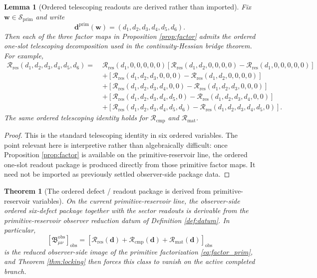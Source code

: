 \documentclass[11pt]{article}
\newcommand{\ObsBurden}{\mathfrak B_{\mu\nu}^{\mathrm{obs}}}
\newcommand{\ObserverClass}[1]{\left[#1\right]_{\mathrm{obs}}}
\newcommand{\DefectTuple}{\mathbf d}
\newcommand{\PrimDefectTuple}{\mathbf d^{\mathrm{prim}}}
\newcommand{\ResidualRead}{\mathscr R_{\mathrm{res}}}
\newcommand{\CompletionRead}{\mathscr R_{\mathrm{cmp}}}
\newcommand{\MatterRead}{\mathscr R_{\mathrm{mat}}}
\newcommand{\PrimShell}{\mathcal S_{\mathrm{prim}}}
\newtheorem{lemma}{Lemma}
\newtheorem{theorem}{Theorem}
\begin{document}
\begin{lemma}[Ordered telescoping readouts are derived rather than imported]
\label{lem:tel}
Fix \(\mathbf w\in\PrimShell\) and write
\[
\PrimDefectTuple(\mathbf w)=(d_1,d_2,d_3,d_4,d_5,d_6).
\]
Then each of the three factor maps in Proposition \ref{prop:factor} admits the ordered one-slot telescoping decomposition used in the continuity-Hessian bridge theorem. For example,
\begin{equation}
\begin{aligned}
\ResidualRead(d_1,d_2,d_3,d_4,d_5,d_6)
=\;&
\ResidualRead(d_1,0,0,0,0,0)
[\ResidualRead(d_1,d_2,0,0,0,0)-\ResidualRead(d_1,0,0,0,0,0)]
\\
&+[\ResidualRead(d_1,d_2,d_3,0,0,0)-\ResidualRead(d_1,d_2,0,0,0,0)]
\\
&+[\ResidualRead(d_1,d_2,d_3,d_4,0,0)-\ResidualRead(d_1,d_2,d_3,0,0,0)]
\\
&+[\ResidualRead(d_1,d_2,d_3,d_4,d_5,0)-\ResidualRead(d_1,d_2,d_3,d_4,0,0)]
\\
&+[\ResidualRead(d_1,d_2,d_3,d_4,d_5,d_6)-\ResidualRead(d_1,d_2,d_3,d_4,d_5,0)].
\end{aligned}
\label{eq:tel}
\end{equation}
The same ordered telescoping identity holds for \(\CompletionRead\) and \(\MatterRead\).
\end{lemma}

\begin{proof}
This is the standard telescoping identity in six ordered variables. The point relevant here is interpretive rather than algebraically difficult: once Proposition \ref{prop:factor} is available on the primitive-reservoir line, the ordered one-slot readout package is produced directly from those primitive factor maps. It need not be imported as previously settled observer-side package data.
\end{proof}

\begin{theorem}[The ordered defect / readout package is derived from primitive-reservoir variables]
\label{thm:readouts}
On the current primitive-reservoir line, the observer-side ordered six-defect package together with the sector readouts is derivable from the primitive-reservoir observer reduction datum of Definition \ref{def:datum}. In particular,
\begin{equation}
\ObserverClass{\ObsBurden}
=
\ObserverClass{
\ResidualRead(\DefectTuple)
+\CompletionRead(\DefectTuple)
+\MatterRead(\DefectTuple)}
\label{eq:burdenfactor}
\end{equation}
is the reduced observer-side image of the primitive factorization \eqref{eq:factor_prim}, and Theorem \ref{thm:locking} then forces this class to vanish on the active completed branch.
\end{theorem}
\end{document}
